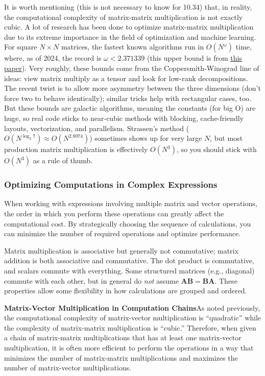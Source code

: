 It is worth mentioning (this is not necessary to know for 10.34) that, in reality, the computational complexity of matrix-matrix multiplication is not exactly cubic. A lot of research has been done to optimize matrix-matrix multiplication due to its extreme importance in the field of optimization and machine learning. For square $N\times N$ matrices, the fastest known algorithms run in $O(N^{\omega})$ time, where, as of 2024, the record is $\omega < 2.371339$ (this upper bound is from \href{https://arxiv.org/abs/2404.16349}{this paper}). Very roughly, these bounds come from the Coppersmith-Winograd line of ideas: view matrix multiply as a tensor and look for low-rank decompositions. The recent twist is to allow more asymmetry between the three dimensions (don't force two to behave identically); similar tricks help with rectangular cases, too. But these bounds are galactic algorithms, meaning the constants (for big O) are huge, so real code sticks to near-cubic methods with blocking, cache-friendly layouts, vectorization, and parallelism. Strassen's method ($O(N^{\log_2 7})\!\approx O(N^{2.8074})$) sometimes shows up for very large $N$, but most production matrix multiplication is effectively $O(N^3)$, so you should stick with $O(N^3)$ as a rule of thumb.


\subsubsection*{Optimizing Computations in Complex Expressions}
When working with expressions involving multiple matrix and vector operations, the order in which you perform these operations can greatly affect the computational cost. By strategically choosing the sequence of calculations, you can minimize the number of required operations and optimize performance.

Matrix multiplication is associative but generally not commutative; matrix addition is both associative and commutative. The dot product is commutative, and scalars commute with everything. Some structured matrices (e.g., diagonal) commute with each other, but in general do \emph{not} assume $ \mathbf{A}\mathbf{B}=\mathbf{B}\mathbf{A} $. These properties allow some flexibility in how calculations are grouped and ordered.

\textbf{Matrix-Vector Multiplication in Computation Chains}\quad As noted previously, the computational complexity of matrix-vector multiplication is ``quadratic'' while the complexity of matrix-matrix multiplication is ``cubic.'' Therefore, when given a chain of matrix-matrix multiplications that has at least one matrix-vector multiplication, it is often more efficient to perform the operations in a way that minimizes the number of matrix-matrix multiplications and maximizes the number of matrix-vector multiplications. 

